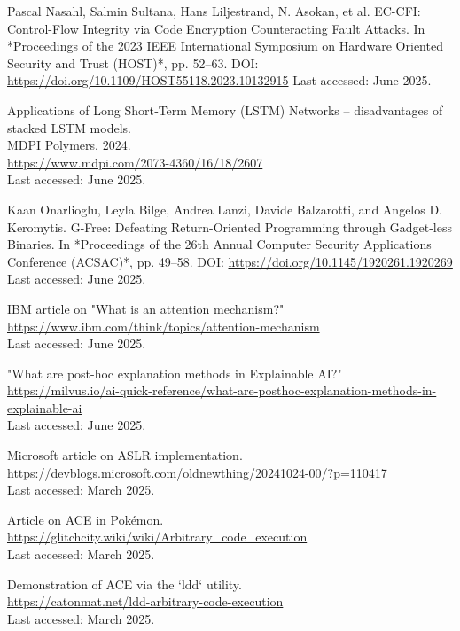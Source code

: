 \documentclass[a4paper]{usiinfbachelorproject}
\begin{document}
\begin{thebibliography}{99}
	Pascal Nasahl, Salmin Sultana, Hans Liljestrand, N. Asokan, et al.
	EC-CFI: Control-Flow Integrity via Code Encryption Counteracting Fault Attacks.
	In *Proceedings of the 2023 IEEE International Symposium on Hardware Oriented Security and Trust (HOST)*, pp. 52–63.
	DOI: \url{https://doi.org/10.1109/HOST55118.2023.10132915}
	Last accessed: June 2025.



	Applications of Long Short‑Term Memory (LSTM) Networks – disadvantages of stacked LSTM models.  \\
	MDPI Polymers, 2024.  \\
	\url{https://www.mdpi.com/2073-4360/16/18/2607}  \\
	Last accessed: June 2025.

	Kaan Onarlioglu, Leyla Bilge, Andrea Lanzi, Davide Balzarotti, and Angelos D. Keromytis.
	G-Free: Defeating Return-Oriented Programming through Gadget-less Binaries.
	In *Proceedings of the 26th Annual Computer Security Applications Conference (ACSAC)*, pp. 49–58.
	DOI: \url{https://doi.org/10.1145/1920261.1920269}
	Last accessed: June 2025.

	IBM article on "What is an attention mechanism?"\\
	\url{https://www.ibm.com/think/topics/attention-mechanism}\\
	Last accessed: June 2025.

	"What are post-hoc explanation methods in Explainable AI?"\\
	\url{https://milvus.io/ai-quick-reference/what-are-posthoc-explanation-methods-in-explainable-ai}\\
	Last accessed: June 2025.

	Microsoft article on ASLR implementation.\\
	\url{https://devblogs.microsoft.com/oldnewthing/20241024-00/?p=110417}\\
	Last accessed: March 2025.

	Article on ACE in Pokémon.\\
	\url{https://glitchcity.wiki/wiki/Arbitrary_code_execution}\\
	Last accessed: March 2025.


	Demonstration of ACE via the `ldd` utility.\\
	\url{https://catonmat.net/ldd-arbitrary-code-execution}\\
	Last accessed: March 2025.


\end{thebibliography}
\end{document}
